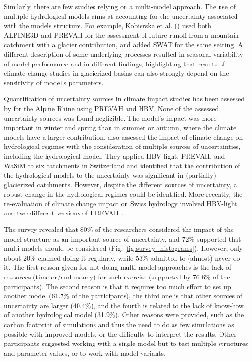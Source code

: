 \documentclass[10pt,a4paper]{article}
\begin{document}
Similarly, there are few studies relying on a multi-model approach. The use of multiple hydrological models aims at accounting for the uncertainty associated with the models structure. For example, Kobierska et al. (\citeyear{Kobierska2011, Kobierska2013}) used both ALPINE3D and PREVAH for the assessment of future runoff from a mountain catchment with a glacier contribution, and \citet{Andrianaki2019} added SWAT for the same setting. A different description of some underlying processes resulted in seasonal variability of model performance and in different findings, highlighting that results of climate change studies in glacierized basins can also strongly depend on the sensitivity of model’s parameters. 

Quantification of uncertainty sources in climate impact studies has been assessed by \citet{Bosshard2013a} for the Alpine Rhine using PREVAH and HBV. None of the assessed uncertainty sources was found negligible. The model’s impact was more important in winter and spring than in summer or autumn, where the climate models have a larger contribution. \citet{Addor2014} also assessed the impact of climate change on hydrological regimes with the consideration of multiple sources of uncertainties, including the hydrological model. They applied HBV-light, PREVAH, and WaSiM to six catchments in Switzerland and identified that the contribution of the hydrological models to the uncertainty was significant in (partially) glacierized catchments. However, despite the different sources of uncertainty, a robust change in the hydrological regimes could be identified. More recently, the re-evaluation of climate change impact on Swiss hydrology involved HBV-light and two different versions of PREVAH \citep{FOEN2021}.

The survey revealed that 80\% of the researchers considered the impact of the model structure as an important source of uncertainty, and 72\% supported that multi-models should be considered (Fig. \ref{fig:survey_histograms}). However, only about 20\% claimed doing it regularly, while 53\% admitted to (almost) never do it. The first reason given for not doing multi-model approaches is the lack of resources (time or/and money) for such exercise (supported by 76.6\% of the participants). The second reason is that it requires too much effort to set up another model (61.7\% of the participants), the third one is that other sources of uncertainty are larger (40.4\%), and the fourth is related to the lack of know-how of another hydrological model (31.9\%). Other reasons were provided, such as the carbon footprint of simulations and thus the need to do as few simulations as possible with improved models, or the difficulty to interpret the results. Other participants suggested working with a single model but to test multiple structures and parameter values, or to work with model variants.
\end{document}

